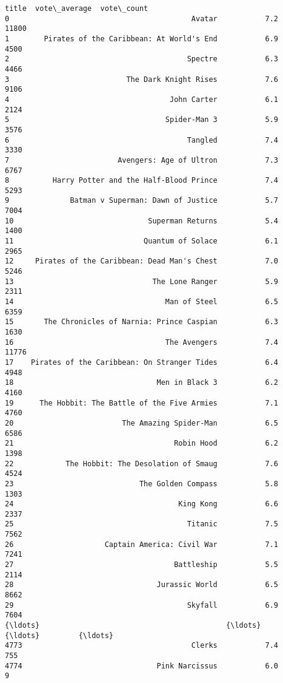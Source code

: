 \documentclass[11pt]{article}
\begin{document}
\begin{Verbatim}[commandchars=\\\{\}]
                                            title  vote\_average  vote\_count  
0                                          Avatar           7.2       11800  
1        Pirates of the Caribbean: At World's End           6.9        4500  
2                                         Spectre           6.3        4466  
3                           The Dark Knight Rises           7.6        9106  
4                                     John Carter           6.1        2124  
5                                    Spider-Man 3           5.9        3576  
6                                         Tangled           7.4        3330  
7                         Avengers: Age of Ultron           7.3        6767  
8          Harry Potter and the Half-Blood Prince           7.4        5293  
9              Batman v Superman: Dawn of Justice           5.7        7004  
10                               Superman Returns           5.4        1400  
11                              Quantum of Solace           6.1        2965  
12     Pirates of the Caribbean: Dead Man's Chest           7.0        5246  
13                                The Lone Ranger           5.9        2311  
14                                   Man of Steel           6.5        6359  
15       The Chronicles of Narnia: Prince Caspian           6.3        1630  
16                                   The Avengers           7.4       11776  
17    Pirates of the Caribbean: On Stranger Tides           6.4        4948  
18                                 Men in Black 3           6.2        4160  
19      The Hobbit: The Battle of the Five Armies           7.1        4760  
20                         The Amazing Spider-Man           6.5        6586  
21                                     Robin Hood           6.2        1398  
22            The Hobbit: The Desolation of Smaug           7.6        4524  
23                             The Golden Compass           5.8        1303  
24                                      King Kong           6.6        2337  
25                                        Titanic           7.5        7562  
26                     Captain America: Civil War           7.1        7241  
27                                     Battleship           5.5        2114  
28                                 Jurassic World           6.5        8662  
29                                        Skyfall           6.9        7604  
{\ldots}                                           {\ldots}           {\ldots}         {\ldots}  
4773                                       Clerks           7.4         755  
4774                               Pink Narcissus           6.0           9  

\end{Verbatim}
\end{document}

